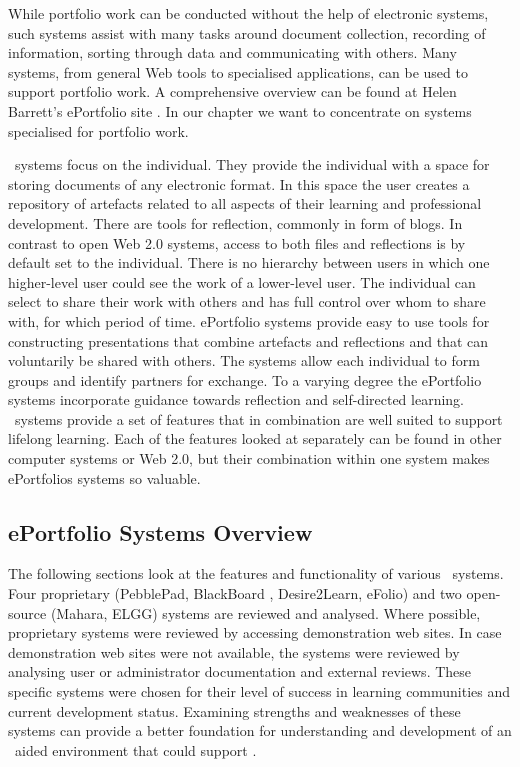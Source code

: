 While portfolio work can be conducted without the help of electronic systems,
such systems assist with many tasks around document collection, recording of
information, sorting through data and communicating with others. Many systems,
from general Web tools to specialised applications, can be used to support
portfolio work. A comprehensive overview can be found at Helen Barrett's
ePortfolio site \citep{Barrett2008}. In our chapter we want to concentrate
on systems specialised for portfolio work.

\ep~systems focus on the individual. They provide the individual with a
space for storing documents of any electronic format. In this space the user
creates a repository of artefacts related to all aspects of their learning and
professional development. There are tools for reflection, commonly in form of
blogs. In contrast to open Web 2.0 systems, access to both files and reflections
is by default set to the individual. There is no hierarchy between users in
which one higher-level user could see the work of a lower-level user. The
individual can select to share their work with others and has full control over
whom to share with, for which period of time. ePortfolio systems provide easy to
use tools for constructing presentations that combine artefacts and reflections
and that can voluntarily be shared with others. The systems allow each
individual to form groups and identify partners for exchange. To a varying
degree the ePortfolio systems incorporate guidance towards reflection and
self-directed learning. \ep~systems provide a set of features that in
combination are well suited to support lifelong learning. Each of the features
looked at separately can be found in other computer systems or Web 2.0, but
their combination within one system makes ePortfolios systems so valuable.

\subsection{ePortfolio Systems Overview}
The following sections look at the features and functionality of various
\ep~systems. Four proprietary (PebblePad, BlackBoard \ep, Desire2Learn, eFolio)
and two open-source (Mahara, ELGG) systems are reviewed and analysed. Where
possible, proprietary systems were reviewed by accessing demonstration web
sites. In case demonstration web sites were not available, the systems were
reviewed by analysing user or administrator documentation and external reviews.
These specific systems were chosen for their level of success in learning
communities and current development status. Examining strengths and weaknesses
of these systems can provide a better foundation for understanding and
development of an \ep~aided environment that could support \LLLsn.

